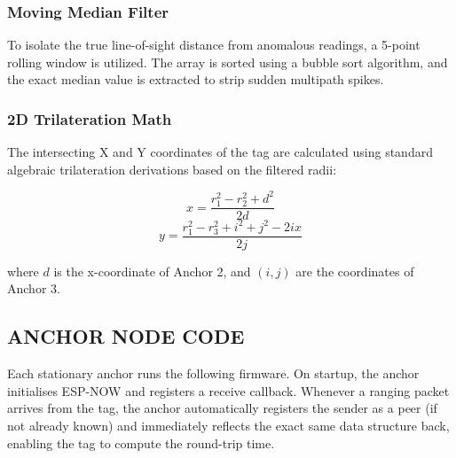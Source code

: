 \documentclass[conference]{IEEEtran}
\begin{document}
\subsubsection{Moving Median Filter}
To isolate the true line-of-sight distance from anomalous readings, a 5-point rolling window is utilized. The array is sorted using a bubble sort algorithm, and the exact median value is extracted to strip sudden multipath spikes.

\subsubsection{2D Trilateration Math}
The intersecting X and Y coordinates of the tag are calculated using standard algebraic trilateration derivations based on the filtered radii:

$$x = \frac{r_1^2 - r_2^2 + d^2}{2d}$$
$$y = \frac{r_1^2 - r_3^2 + i^2 + j^2 - 2ix}{2j}$$

where $d$ is the x-coordinate of Anchor 2, and $(i, j)$ are the coordinates of Anchor 3.
\newpage
\subsection{ANCHOR NODE CODE}
Each stationary anchor runs the following firmware. On startup, the anchor initialises ESP-NOW and registers a receive callback. Whenever a ranging packet arrives from the tag, the anchor automatically registers the sender as a peer (if not already known) and immediately reflects the exact same data structure back, enabling the tag to compute the round-trip time.
\end{document}
